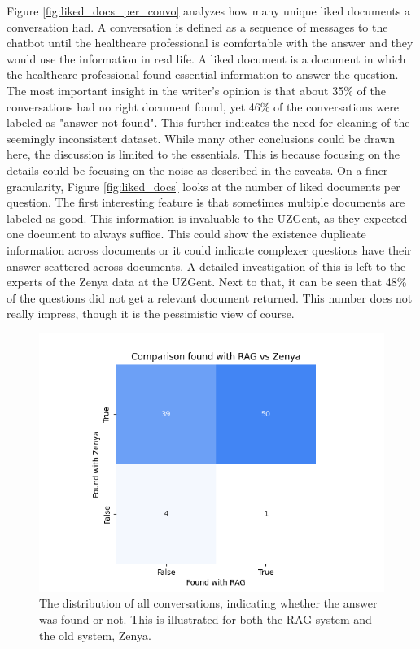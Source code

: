 Figure \ref{fig:liked_docs_per_convo} analyzes how many unique liked documents a conversation had. A conversation is defined as a sequence of messages to the chatbot until the healthcare professional is comfortable with the answer and they would use the information in real life. A liked document is a document in which the healthcare professional found essential information to answer the question. The most important insight in the writer's opinion is that about 35\% of the conversations had no right document found, yet 46\% of the conversations were labeled as "answer not found". This further indicates the need for cleaning of the seemingly inconsistent dataset. While many other conclusions could be drawn here, the discussion is limited to the essentials. This is because focusing on the details could be focusing on the noise as described in the caveats. On a finer granularity, Figure \ref{fig:liked_docs} looks at the number of liked documents per question. The first interesting feature is that sometimes multiple documents are labeled as good. This information is invaluable to the UZGent, as they expected one document to always suffice. This could show the existence duplicate information across documents or it could indicate complexer questions have their answer scattered across documents. A detailed investigation of this is left to the experts of the Zenya data at the UZGent. Next to that, it can be seen that 48\% of the questions did not get a relevant document returned. This number does not really impress, though it is the pessimistic view of course.

\begin{figure}[H]
    \centerline{\includegraphics[width=0.9\linewidth]{fig/RAG_found_plot.png}}
    \caption{The distribution of all conversations, indicating whether the answer was found or not. This is illustrated for both the RAG system and the old system, Zenya.}
    \label{fig:found_rate}
\end{figure}

